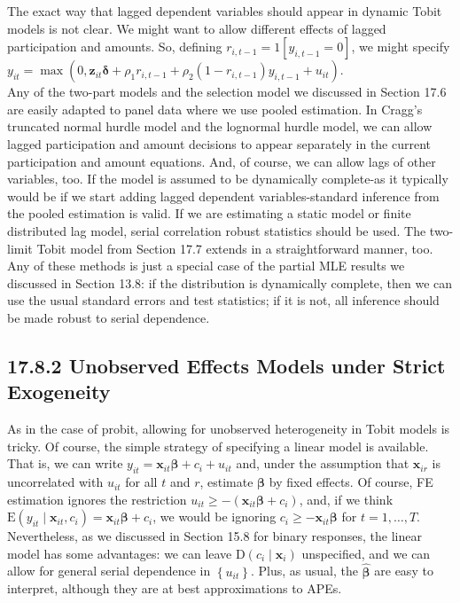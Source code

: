 \documentclass[10pt]{article}
\begin{document}
The exact way that lagged dependent variables should appear in dynamic Tobit models is not clear. We might want to allow different effects of lagged participation and amounts. So, defining $r_{i, t-1}=1\left[y_{i, t-1}=0\right]$, we might specify\\
$y_{i t}=\max \left(0, \mathbf{z}_{i t} \boldsymbol{\delta}+\rho_{1} r_{i, t-1}+\rho_{2}\left(1-r_{i, t-1}\right) y_{i, t-1}+u_{i t}\right)$.\\
Any of the two-part models and the selection model we discussed in Section 17.6 are easily adapted to panel data where we use pooled estimation. In Cragg's truncated normal hurdle model and the lognormal hurdle model, we can allow lagged participation and amount decisions to appear separately in the current participation and amount equations. And, of course, we can allow lags of other variables, too. If the model is assumed to be dynamically complete-as it typically would be if we start adding lagged dependent variables-standard inference from the pooled estimation is valid. If we are estimating a static model or finite distributed lag model, serial correlation robust statistics should be used. The two-limit Tobit model from Section 17.7 extends in a straightforward manner, too. Any of these methods is just a special case of the partial MLE results we discussed in Section 13.8: if the distribution is dynamically complete, then we can use the usual standard errors and test statistics; if it is not, all inference should be made robust to serial dependence.

\subsection*{17.8.2 Unobserved Effects Models under Strict Exogeneity}
As in the case of probit, allowing for unobserved heterogeneity in Tobit models is tricky. Of course, the simple strategy of specifying a linear model is available. That is, we can write $y_{i t}=\mathbf{x}_{i t} \boldsymbol{\beta}+c_{i}+u_{i t}$ and, under the assumption that $\mathbf{x}_{i r}$ is uncorrelated with $u_{i t}$ for all $t$ and $r$, estimate $\boldsymbol{\beta}$ by fixed effects. Of course, FE estimation ignores the restriction $u_{i t} \geq-\left(\mathbf{x}_{i t} \boldsymbol{\beta}+c_{i}\right)$, and, if we think $\mathrm{E}\left(y_{i t} \mid \mathbf{x}_{i t}, c_{i}\right)=\mathbf{x}_{i t} \boldsymbol{\beta}+c_{i}$, we would be ignoring $c_{i} \geq-\mathbf{x}_{i t} \boldsymbol{\beta}$ for $t=1, \ldots, T$. Nevertheless, as we discussed in Section 15.8 for binary responses, the linear model has some advantages: we can leave $\mathrm{D}\left(c_{i} \mid \mathbf{x}_{i}\right)$ unspecified, and we can allow for general serial dependence in $\left\{u_{i t}\right\}$. Plus, as usual, the $\hat{\boldsymbol{\beta}}$ are easy to interpret, although they are at best approximations to APEs.
\end{document}
